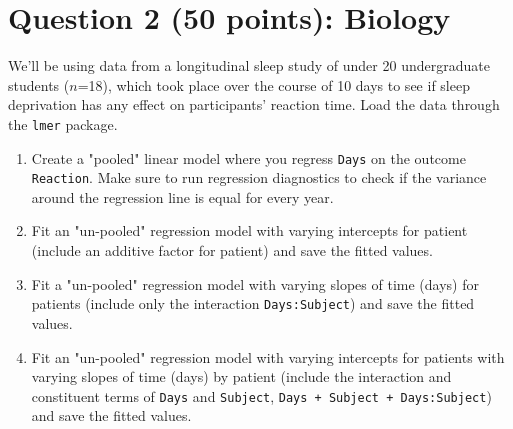 \documentclass[12pt,letterpaper]{article}
\begin{document}
\section*{Question 2 (50 points): Biology}
\noindent We'll be using data from a longitudinal sleep study of under 20 undergraduate students ($n$=18), which took place over the course of 10 days to see if sleep deprivation has any effect on participants' reaction time. Load the data through the \texttt{lmer} package.

\begin{enumerate}
	\item
	Create a "pooled" linear model where you regress \texttt{Days} on the outcome \texttt{Reaction}. Make sure to run regression diagnostics to check if the variance around the regression line is equal for every year.
	
\vspace{.5cm}
  
\vspace{.5cm}
	
	\item Fit an "un-pooled" regression model with varying intercepts for patient (include an additive factor for patient) and save the fitted values.
	
\vspace{.5cm}
  
\vspace{.5cm}
	
	\item Fit a "un-pooled" regression model with varying slopes of time (days) for patients (include only the interaction \texttt{Days:Subject}) and save the fitted values.
	
\vspace{.5cm}
  
\vspace{.5cm}
	
	\item Fit an "un-pooled" regression model with varying intercepts for patients with varying slopes of time (days) by patient (include the interaction and constituent terms of \texttt{Days} and \texttt{Subject}, \texttt{Days + Subject + Days:Subject}) and save the fitted values.
	
\vspace{.5cm}
  
\vspace{.5cm}
	

\end{enumerate}
\end{document}
